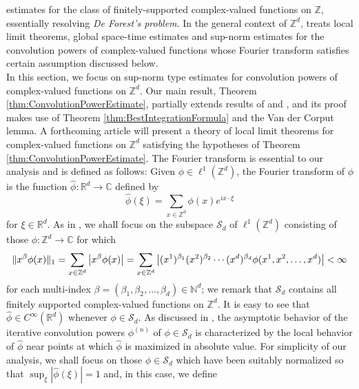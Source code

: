 \documentclass[11pt]{article}
\theoremstyle{remark}
\begin{document}
estimates for the class of finitely-supported complex-valued functions on $\mathbb{Z}$, essentially resolving \textit{De Forest's problem}. In the general context of $\mathbb{Z}^d$, \cite{randles_convolution_2017} treats local limit theorems, global space-time estimates and sup-norm estimates for the convolution powers of complex-valued functions whose Fourier transform satisfies certain assumption discussed below.  \\

\noindent In this section, we focus on sup-norm type estimates for convolution powers of complex-valued functions on $\mathbb{Z}^d$. Our main result, Theorem \ref{thm:ConvolutionPowerEstimate}, partially extends results of \cite{randles_convolution_2015} and \cite{randles_convolution_2017}, and its proof makes use of Theorem \ref{thm:BestIntegrationFormula} and the Van der Corput lemma. A forthcoming article will present a theory of local limit theorems for complex-valued functions on $\mathbb{Z}^d$ satisfying the hypotheses of Theorem \ref{thm:ConvolutionPowerEstimate}. The Fourier transform is essential to our analysis and is defined as follows: Given $\phi\in\ell^1(\mathbb{Z}^d)$, the Fourier transform of $\phi$ is the function $\widehat{\phi}:\mathbb{R}^d\to\mathbb{C}$ defined by
\begin{equation*}
    \widehat{\phi}(\xi)=\sum_{x\in\mathbb{Z}^d}\phi(x)e^{ix\cdot\xi}
\end{equation*}
for $\xi\in\mathbb{R}^d$. As in \cite{randles_convolution_2017}, we shall focus on the subspace $\mathcal{S}_d$ of $\ell^1(\mathbb{Z}^d)$ consisting of those $\phi:\mathbb{Z}^d\to\mathbb{C}$ for which
\begin{equation*}
    \|x^\beta \phi(x)\|_1=\sum_{x\in\mathbb{Z}^d}\abs{x^\beta\phi(x)}=\sum_{x\in\mathbb{Z}^d}\abs{(x^1)^{\beta_1}(x^2)^{\beta_2}\cdots(x^d)^{\beta_d}\phi(x^1,x^2,\dots,x^d)}<\infty
\end{equation*}
for each multi-index $\beta=(\beta_1,\beta_2,\dots,\beta_d)\in\mathbb{N}^d$; we remark that $\mathcal{S}_d$ contains all finitely supported complex-valued functions on $\mathbb{Z}^d$.  It is easy to see that $\widehat{\phi}\in C^\infty(\mathbb{R}^d)$ whenever $\phi\in \mathcal{S}_d$. As discussed in \cite{thomee_stability_1965,diaconis_convolution_2014,randles_convolution_2015,randles_convolution_2017}, the asymptotic behavior of the iterative convolution powers $\phi^{(n)}$ of $\phi\in\mathcal{S}_d$ is characterized by the local behavior of $\widehat{\phi}$ near points at which $\widehat{\phi}$ is maximized in absolute value. For simplicity of our analysis, we shall focus on those $\phi\in\mathcal{S}_d$ which have been suitably normalized so that $\sup_{\xi}|\widehat{\phi}(\xi)|=1$ and, in this case, we define
\end{document}
